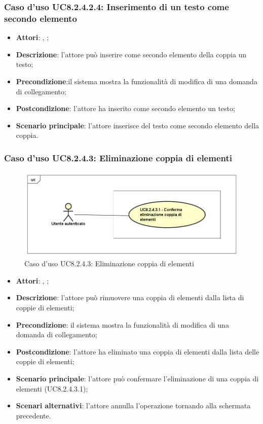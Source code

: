		\subsubsection{Caso d'uso UC8.2.4.2.4: Inserimento di un testo come secondo elemento}
		\label{UC8.2.4.2.4}
		\begin{itemize}
			\item \textbf{Attori}: \uau, \uaupro;
			\item \textbf{Descrizione}: l'attore può inserire come secondo elemento della coppia un testo;
			\item \textbf{Precondizione}:il sistema mostra la funzionalità di modifica di una domanda di collegamento; 
			\item \textbf{Postcondizione}: l'attore ha inserito come secondo elemento un testo;
			\item \textbf{Scenario principale}: l'attore inserisce del testo come secondo elemento della coppia.
		\end{itemize}
	
	\subsubsection{Caso d'uso UC8.2.4.3: Eliminazione coppia di elementi}
	\label{UC8.2.4.3}
	\begin{figure}[h]
		\centering
		\includegraphics[scale=0.5,keepaspectratio]{UML/UC8_2_4_3.png}
		\caption{Caso d'uso UC8.2.4.3: Eliminazione coppia di elementi}
	\end{figure}
	\FloatBarrier
	\begin{itemize}
		\item \textbf{Attori}: \uau, \uaupro;
		\item \textbf{Descrizione}: l'attore può rimuovere una coppia di elementi dalla lista di coppie di elementi;
		\item \textbf{Precondizione}: il sistema mostra la funzionalità di modifica di una domanda di collegamento; 
		\item \textbf{Postcondizione}: l'attore ha eliminato una coppia di elementi dalla lista delle coppie di elementi;
		\item \textbf{Scenario principale}: l'attore può confermare l'eliminazione di una coppia di elementi (UC8.2.4.3.1);
		\item \textbf{Scenari alternativi}: l'attore annulla l'operazione tornando alla schermata precedente.
	\end{itemize}

